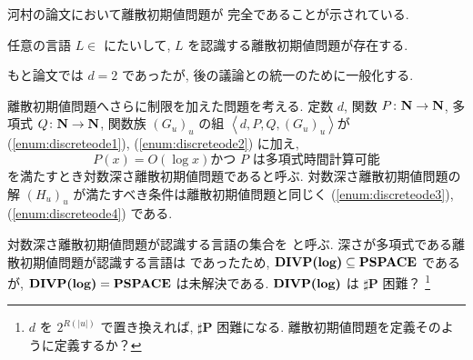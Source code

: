  河村の論文において離散初期値問題が \PSPACE 完全であることが示されている.

 \begin{lemma}
  \label{WeakFeedback}
  任意の言語 $L \in $ \PSPACE にたいして,
  $L$ を認識する離散初期値問題が存在する.
 \end{lemma}

 もと論文では $d = 2$ であったが, 後の議論との統一のために一般化する.



  離散初期値問題へさらに制限を加えた問題を考える.
  定数 $d$, 関数 $P \colon \mathbf N \to \mathbf N$, 多項式 $Q \colon \mathbf N \to \mathbf N$, 
  関数族 $(G_u)_u$ の組 $\left< d, P, Q, (G_u)_u \right>$が
  (\ref{enum:discreteode1}), (\ref{enum:discreteode2}) に加え,
  \begin{equation}
   P(x) = O(\log x) \text{かつ $P$ は多項式時間計算可能}
  \end{equation}
  を満たすとき対数深さ離散初期値問題であると呼ぶ.
  対数深さ離散初期値問題の解 $(H_u)_u$ が満たすべき条件は離散初期値問題と同じく
  (\ref{enum:discreteode3}), (\ref{enum:discreteode4}) である.

  対数深さ離散初期値問題が認識する言語の集合を \DIVPlog と呼ぶ.
  深さが多項式である離散初期値問題が認識する言語は \PSPACE であったため,
  $\text{\bf DIVP(log)} \subseteq {\bf PSPACE}$ であるが, $\text{\bf DIVP(log)} = {\bf PSPACE}$ は未解決である.
  $\text{\bf DIVP(log)}$ は $\sharp${\bf P} 困難？    
  \footnote{$d$ を $2^{R(|u|)}$ で置き換えれば, $\sharp${\bf P} 困難になる.
  離散初期値問題を定義そのように定義するか？}
